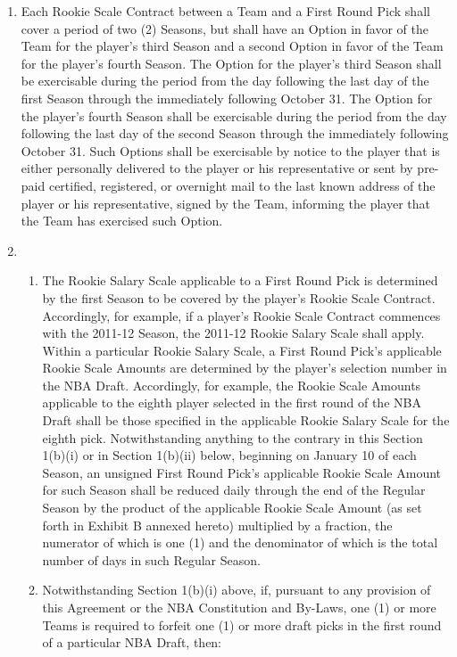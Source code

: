 \documentclass[
]{book}
\providecommand{\tightlist}{%
  \setlength{\itemsep}{0pt}\setlength{\parskip}{0pt}}
\begin{document}
\begin{enumerate}
\def\labelenumi{(\alph{enumi})}
\item
  Each Rookie Scale Contract between a Team and a First Round Pick shall cover a period of two (2) Seasons, but shall have an Option in favor of the Team for the player's third Season and a second Option in favor of the Team for the player's fourth Season. The Option for the player's third Season shall be exercisable during the period from the day following the last day of the first Season through the immediately following October 31. The Option for the player's fourth Season shall be exercisable during the period from the day following the last day of the second Season through the immediately following October 31. Such Options shall be exercisable by notice to the player that is either personally delivered to the player or his representative or sent by pre-paid certified, registered, or overnight mail to the last known address of the player or his representative, signed by the Team, informing the player that the Team has exercised such Option.
\item
  \begin{enumerate}
  \def\labelenumii{(\roman{enumii})}
  \tightlist
  \item
    The Rookie Salary Scale applicable to a First Round Pick is determined by the first Season to be covered by the player's Rookie Scale Contract. Accordingly, for example, if a player's Rookie Scale Contract commences with the 2011-12 Season, the 2011-12 Rookie Salary Scale shall apply. Within a particular Rookie Salary Scale, a First Round Pick's applicable Rookie Scale Amounts are determined by the player's selection number in the NBA Draft. Accordingly, for example, the Rookie Scale Amounts applicable to the eighth player selected in the first round of the NBA Draft shall be those specified in the applicable Rookie Salary Scale for the eighth pick. Notwithstanding anything to the contrary in this Section 1(b)(i) or in Section 1(b)(ii) below, beginning on January 10 of each Season, an unsigned First Round Pick's applicable Rookie Scale Amount for such Season shall be reduced daily through the end of the Regular Season by the product of the applicable Rookie Scale Amount (as set forth in Exhibit B annexed hereto) multiplied by a fraction, the numerator of which is one (1) and the denominator of which is the total number of days in such Regular Season.
  \item
    Notwithstanding Section 1(b)(i) above, if, pursuant to any provision of this Agreement or the NBA Constitution and By-Laws, one (1) or more Teams is required to forfeit one (1) or more draft picks in the first round of a particular NBA Draft, then:

\end{enumerate}
\end{enumerate}
\end{document}
